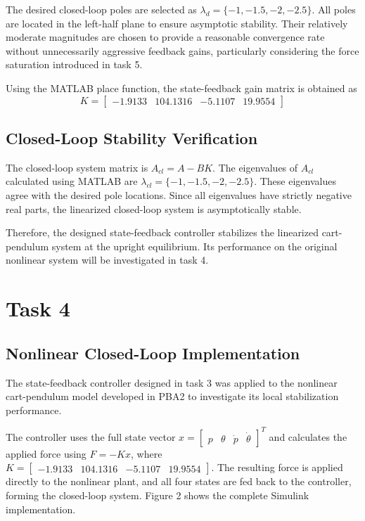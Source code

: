 \documentclass[12pt]{article}
\begin{document}
The desired closed-loop poles are selected as $\lambda_d = \{-1, -1.5, -2, -2.5\}$. All poles are located in the left-half plane to ensure asymptotic stability. Their relatively moderate magnitudes are chosen to provide a reasonable convergence rate without unnecessarily aggressive feedback gains, particularly considering the force saturation introduced in task 5.

Using the MATLAB place function, the state-feedback gain matrix is obtained as
$$K = \begin{bmatrix}
    -1.9133 & 104.1316 & -5.1107 & 19.9554
\end{bmatrix}$$

\subsection{Closed-Loop Stability Verification}

The closed-loop system matrix is $A_{cl} = A-BK$. The eigenvalues of $A_{cl}$ calculated using MATLAB are $\lambda_{cl} = \{-1, -1.5, -2, -2.5\}$. These eigenvalues agree with the desired pole locations. Since all eigenvalues have strictly negative real parts, the linearized closed-loop system is asymptotically stable.

Therefore, the designed state-feedback controller stabilizes the linearized cart-pendulum system at the upright equilibrium. Its performance on the original nonlinear system will be investigated in task 4.

\section{Task 4}

\subsection{Nonlinear Closed-Loop Implementation}

The state-feedback controller designed in task 3 was applied to the nonlinear cart-pendulum model developed in PBA2 to investigate its local stabilization performance.

The controller uses the full state vector $x = \begin{bmatrix}
    p & \theta & \dot{p} & \dot{\theta}
\end{bmatrix}^T$ and calculates the applied force using $F = -Kx$, where $K = \begin{bmatrix}
    -1.9133 & 104.1316 & -5.1107 & 19.9554
\end{bmatrix}$. The resulting force is applied directly to the nonlinear plant, and all four states are fed back to the controller, forming the closed-loop system. Figure 2 shows the complete Simulink implementation.
\end{document}
